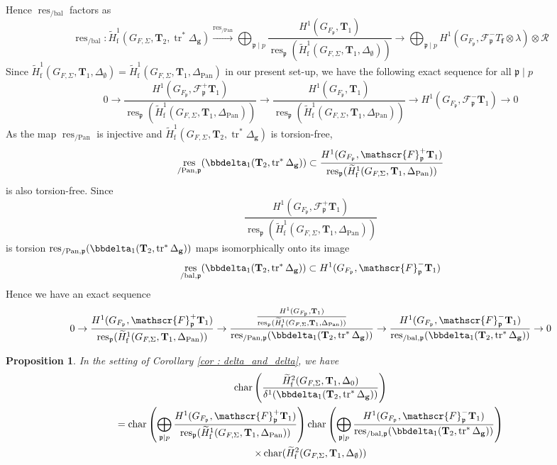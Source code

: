 \documentclass[10pt]{amsart}
\numberwithin{equation}{section}
\newtheorem{prop}[thm]{Proposition}
\theoremstyle{definition}
\theoremstyle{remark} %
\DeclareMathOperator{\Char}{char}
\newcommand{\pan}{\mathrm{Pan}}
\DeclareMathOperator{\res}{res}
\DeclareMathOperator{\tr}{{tr}^*}
\renewcommand{\b}{\mathrm{bal}}
\newcommand{\f}{\mathbf{f}}
\newcommand{\scrF}{\mathscr{F}}
\newcommand{\g}{\mathbf{g}}
\newcommand{\p}{\mathfrak{p}}
\newcommand{\R}{\mathcal{R}}
\newcommand{\T}{\mathbf{T}}
\begin{document}
		Hence $ \res_{/\b} $ factors as 
		$$ \res_{/\b} \colon \widetilde{H}^1_{\mathrm{f}}(G_{F,\Sigma}, \T_2, \operatorname{tr}^*\Delta_{\g}) \xrightarrow{\res_{/\pan}} \bigoplus_{\p \mid p} \frac{H^1(G_{F_{\p}}, \T_{1})}{\res_{\p}(\widetilde{H}^1_{\mathrm{f}}(G_{F,\Sigma},\T_{1}, \Delta_{\emptyset}))} \rightarrow \bigoplus_{\p \mid p} H^1(G_{F_\p},\scrF^-_\p T_\f \otimes \lambda) \otimes \R $$
		Since $ \widetilde{H}^1_{\mathrm{f}}(G_{F,\Sigma},\T_{1}, \Delta_{\emptyset}) = \widetilde{H}^1_{\mathrm{f}}(G_{F,\Sigma},\T_{1}, \Delta_{\pan}) $ in our present set-up, we have the following exact sequence for all $ \p \mid p $ 
		$$ 0 \rightarrow \frac{H^1(G_{F_\p},\scrF^+_\p \T_{1})}{\res_{\p}(\widetilde{H}^1_{\mathrm{f}}(G_{F,\Sigma},\T_{1}, \Delta_{\pan})) } \rightarrow \frac{H^1(G_{F_\p},\T_{1})}{\res_{\p}(\widetilde{H}^1_{\mathrm{f}}(G_{F,\Sigma},\T_{1}, \Delta_{\pan})) } \rightarrow H^1(G_{F_\p},\scrF^-_\p \T_{1}) \rightarrow 0 $$
		As the map $ \res_{/\pan} $ is injective and $ \widetilde{H}^1_{\mathrm{f}}(G_{F,\Sigma}, \T_2, \operatorname{tr}^*\Delta_{\g}) $ is torsion-free, 
		$$ \res_{/\pan, \p}(\bbdelta_1(\T_2, \operatorname{tr}^*\Delta_{\g})) \subset \frac{H^1(G_{F_\p},\scrF^+_\p \T_{1})}{\res_{\p}(\widetilde{H}^1_{\mathrm{f}}(G_{F,\Sigma},\T_{1}, \Delta_{\pan})) } $$ 
		is also torsion-free.
		Since $$ \frac{H^1(G_{F_\p},\scrF^+_\p \T_{1})}{\res_{\p}(\widetilde{H}^1_{\mathrm{f}}(G_{F,\Sigma},\T_{1}, \Delta_{\pan})) } $$ is torsion
		$\res_{/\pan, \p}(\bbdelta_1(\T_2, \operatorname{tr}^*\Delta_{\g}))$ maps isomorphically onto its image 
		$$ \res_{/\b, \p}(\bbdelta_1(\T_2, \operatorname{tr}^*\Delta_{\g})) \subset H^1(G_{F_\p},\scrF^-_\p \T_{1}) $$
		Hence we have an exact sequence
		\begin{equation}
			0 \rightarrow \frac{H^1(G_{F_\p},\scrF^+_\p \T_{1})}{\res_{\p}(\widetilde{H}^1_{\mathrm{f}}(G_{F,\Sigma},\T_{1}, \Delta_{\pan})) } \rightarrow \dfrac{\frac{H^1(G_{F_\p},\T_{1})}{\res_{\p}(\widetilde{H}^1_{\mathrm{f}}(G_{F,\Sigma},\T_{1}, \Delta_{\pan})) }}{\res_{/\pan, \p}(\bbdelta_1(\T_2, \operatorname{tr}^*\Delta_{\g}))} \rightarrow \frac{H^1(G_{F_\p},\scrF^-_\p \T_{1})}{ \res_{/\b, \p}(\bbdelta_1(\T_2, \operatorname{tr}^*\Delta_{\g}))} \rightarrow 0
		\end{equation} 
		\begin{prop}
			In the setting of Corollary \ref{cor : delta_and_delta}, we have 
			\begin{multline}
				\Char\left( \dfrac{\widetilde{H}^2_{\mathrm{f}}(G_{F,\Sigma}, \T_1, \Delta_{0})}{\delta^1(\bbdelta_1(\T_{2}, \tr\Delta_{\g}))} \right) \\
				= \Char\left( \bigoplus_{\p \mid p}\frac{H^1(G_{F_\p},\scrF^+_\p \T_{1})}{\res_{\p}(\widetilde{H}^1_{\mathrm{f}}(G_{F,\Sigma},\T_{1}, \Delta_{\pan})) }\right) \Char\left( \bigoplus_{\p \mid p} \frac{H^1(G_{F_\p},\scrF^-_\p \T_{1})}{ \res_{/\b, \p}(\bbdelta_1(\T_2, \operatorname{tr}^*\Delta_{\g}))} \right) \\ \times \Char(\widetilde{H}^2_{\mathrm{f}}(G_{F,\Sigma}, \T_1, \Delta_{\emptyset}))
			\end{multline} 
			
		\end{prop}
\end{document}
